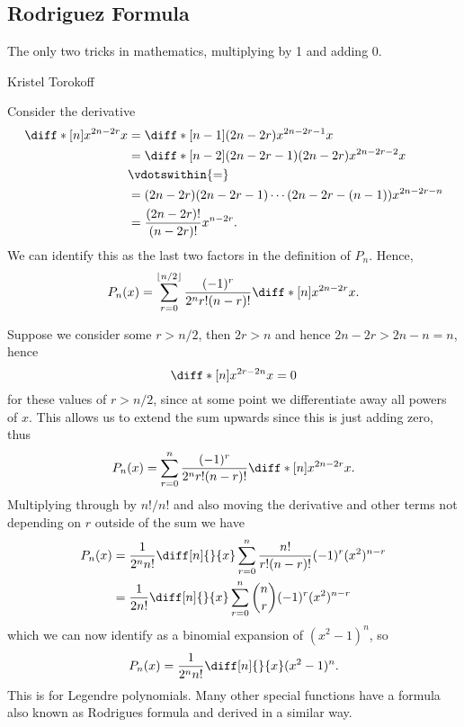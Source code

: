 \documentclass[fleqn]{NotesClass}
\begin{document}
    \subsection{Rodriguez Formula}
    \epigraph{The only two tricks in mathematics, multiplying by 1 and adding 0.}{Kristel Torokoff}
    Consider the derivative
    \begin{align}
        \diff*[n]{x^{2n - 2r}}{x} &= \diff*[n-1]{(2n - 2r)x^{2n-2r-1}}{x}\\
        &= \diff*[n-2]{(2n - 2r - 1)(2n - 2r)x^{2n - 2r - 2}}{x}\\
        &\vdotswithin{=} \\
        &= (2n - 2r)(2n - 2r - 1) \dotsm (2n - 2r - (n - 1))x^{2n - 2r - n}\\
        &= \frac{(2n - 2r)!}{(n - 2r)!}x^{n - 2r}.
    \end{align}
    We can identify this as the last two factors in the definition of \(P_n\).
    Hence,
    \begin{equation}
        P_n(x) = \sum_{r=0}^{\lfloor n/2 \rfloor} \frac{(-1)^{r}}{2^nr!(n - r)!} \diff*[n]{x^{2n - 2r}}{x}.
    \end{equation}

    Suppose we consider some \(r > n/2\), then \(2r > n\) and hence \(2n - 2r > 2n - n = n\), hence
    \begin{equation}
        \diff*[n]{x^{2r - 2n}}{x} = 0
    \end{equation}
    for these values of \(r > n/2\), since at some point we differentiate away all powers of \(x\).
    This allows us to extend the sum upwards since this is just adding zero, thus
    \begin{equation}
        P_n(x) = \sum_{r=0}^{n} \frac{(-1)^r}{2^nr!(n - r)!} \diff*[n]{x^{2n - 2r}}{x}.
    \end{equation}
    Multiplying through by \(n!/n!\) and also moving the derivative and other terms not depending on \(r\) outside of the sum we have
    \begin{align}
        P_n(x) &= \frac{1}{2^nn!} \diff[n]{}{x} \sum_{r=0}^{n} \frac{n!}{r!(n - r)!} (-1)^r (x^2)^{n - r}\\
        &= \frac{1}{2n!} \diff[n]{}{x} \sum_{r=0}^{n} \binom{n}{r} (-1)^{r}(x^2)^{n - r}
    \end{align}
    which we can now identify as a binomial expansion of \((x^2 - 1)^n\), so
    \begin{equation}\label{eqn:rodrigues formula legendre polynomials}
        P_n(x) = \frac{1}{2^nn!} \diff[n]{}{x}(x^2 - 1)^n.
    \end{equation}
    This is  for Legendre polynomials.
    Many other special functions have a formula also known as Rodrigues formula and derived in a similar way.
    
\end{document}

